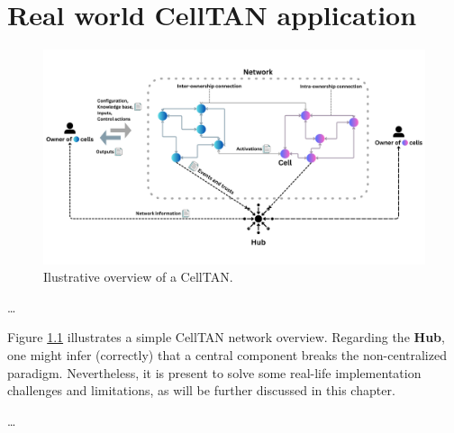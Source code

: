 \chapter{Real world CellTAN application} \label{chap:chap5}


\begin{figure}[h!]
    \centering
    \includegraphics[width=\linewidth]{figures/chapter4/cell/celltan.pdf}
    \caption{Ilustrative overview of a CellTAN.}
    \label{fig:celltan}
\end{figure}


\dots

Figure \ref{fig:celltan} illustrates a simple CellTAN network overview. Regarding the \textbf{Hub}, one might infer (correctly) that a central component breaks the non-centralized paradigm. Nevertheless, it is present to solve some real-life implementation challenges and limitations, as will be further discussed in this chapter.

\dots